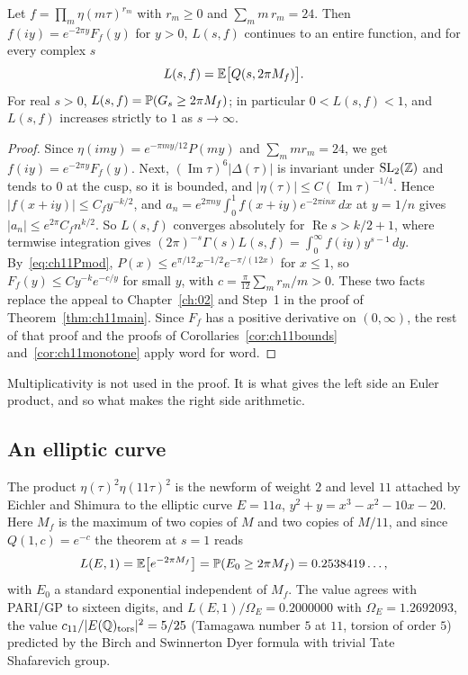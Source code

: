 \begin{theorem}\label{thm:ch11general}
Let $f=\prod_m\eta(m\tau)^{r_m}$ with $r_m\ge0$ and $\sum_mm\,r_m=24$. Then $f(iy)=e^{-2\pi y}F_f(y)$ for $y>0$, $L(s,f)$ continues to an entire function, and for every complex $s$
\[
L(s,f)=\mathbb{E}\bigl[Q(s,2\pi M_f)\bigr].
\]
For real $s>0$, $L(s,f)=\mathbb{P}(G_s\ge2\pi M_f)$; in particular $0<L(s,f)<1$, and $L(s,f)$ increases strictly to $1$ as $s\to\infty$.
\end{theorem}

\begin{proof}
Since $\eta(imy)=e^{-\pi my/12}P(my)$ and $\sum_mmr_m=24$, we get $f(iy)=e^{-2\pi y}F_f(y)$. Next, $(\operatorname{Im}\tau)^6|\Delta(\tau)|$ is invariant under $\mathrm{SL}_2(\mathbb{Z})$ and tends to $0$ at the cusp, so it is bounded, and $|\eta(\tau)|\le C(\operatorname{Im}\tau)^{-1/4}$. Hence $|f(x+iy)|\le C_fy^{-k/2}$, and $a_n=e^{2\pi ny}\int_0^1f(x+iy)e^{-2\pi inx}\,dx$ at $y=1/n$ gives $|a_n|\le e^{2\pi}C_fn^{k/2}$. So $L(s,f)$ converges absolutely for $\operatorname{Re}s>k/2+1$, where termwise integration gives $(2\pi)^{-s}\Gamma(s)L(s,f)=\int_0^\infty f(iy)y^{s-1}\,dy$. By~\eqref{eq:ch11Pmod}, $P(x)\le e^{\pi/12}x^{-1/2}e^{-\pi/(12x)}$ for $x\le1$, so $F_f(y)\le Cy^{-k}e^{-c/y}$ for small $y$, with $c=\frac{\pi}{12}\sum_mr_m/m>0$. These two facts replace the appeal to Chapter~\ref{ch:02} and Step~1 in the proof of Theorem~\ref{thm:ch11main}. Since $F_f$ has a positive derivative on $(0,\infty)$, the rest of that proof and the proofs of Corollaries~\ref{cor:ch11bounds} and~\ref{cor:ch11monotone} apply word for word.
\end{proof}

Multiplicativity is not used in the proof. It is what gives the left side an Euler product, and so what makes the right side arithmetic.

\subsection{An elliptic curve}

The product $\eta(\tau)^2\eta(11\tau)^2$ is the newform of weight $2$ and level $11$ attached by Eichler and Shimura \cite{eichler1954,shimura1971} to the elliptic curve $E=11a$, $y^2+y=x^3-x^2-10x-20$. Here $M_f$ is the maximum of two copies of $M$ and two copies of $M/11$, and since $Q(1,c)=e^{-c}$ the theorem at $s=1$ reads
\[
L(E,1)=\mathbb{E}\bigl[e^{-2\pi M_f}\bigr]=\mathbb{P}(E_0\ge2\pi M_f)=0.2538419\ldots,
\]
with $E_0$ a standard exponential independent of $M_f$. The value agrees with PARI/GP to sixteen digits, and $L(E,1)/\Omega_E=0.2000000$ with $\Omega_E=1.2692093$, the value $c_{11}/|E(\mathbb{Q})_{\mathrm{tors}}|^2=5/25$ (Tamagawa number $5$ at $11$, torsion of order $5$) predicted by the Birch and Swinnerton Dyer formula \cite{bsd1965} with trivial Tate Shafarevich group.


